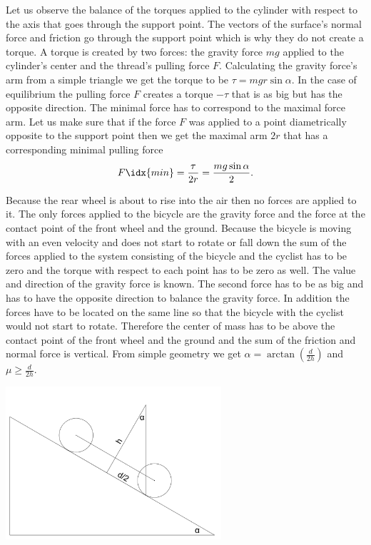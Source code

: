 \documentclass[11pt]{article}
\begin{document}

\solueng
Let us observe the balance of the torques applied to the cylinder with respect to the axis that goes through the support point. The vectors of the surface’s normal force and friction go through the support point which is why they do not create a torque. A torque is created by two forces: the gravity force $mg$ applied to the cylinder’s center and the thread’s pulling force $F$. Calculating the gravity force’s arm from a simple triangle we get the torque to be $\tau=mgr\sin\alpha$. In the case of equilibrium the pulling force $F$ creates a torque $-\tau$ that is as big but has the opposite direction. The minimal force has to correspond to the maximal force arm. Let us make sure that if the force $F$ was applied to a point diametrically opposite to the support point then we get the maximal arm $2r$ that has a corresponding minimal pulling force
\[F\idx{min}=\frac{\tau}{2r}=\frac{mg\sin\alpha}{2}.\]
\probend
\bigskip


\solueng
Because the rear wheel is about to rise into the air then no forces are applied to it. The only forces applied to the bicycle are the gravity force and the force at the contact point of the front wheel and the ground. Because the bicycle is moving with an even velocity and does not start to rotate or fall down the sum of the forces applied to the system consisting of the bicycle and the cyclist has to be zero and the torque with respect to each point has to be zero as well. The value and direction of the gravity force is known. The second force has to be as big and has to have the opposite direction to balance the gravity force. In addition the forces have to be located on the same line so that the bicycle with the cyclist would not start to rotate. Therefore the center of mass has to be above the contact point of the front wheel and the ground and the sum of the friction and normal force is vertical. From simple geometry we get $\alpha=\arctan(\frac{d}{2h})$ and $\mu\ge\frac{d}{2h}$. 
\begin{center}
\includegraphics[width=0.6\textwidth]{2014-lahg-08-ratas}
\end{center}
\probend
\bigskip
\end{document}
